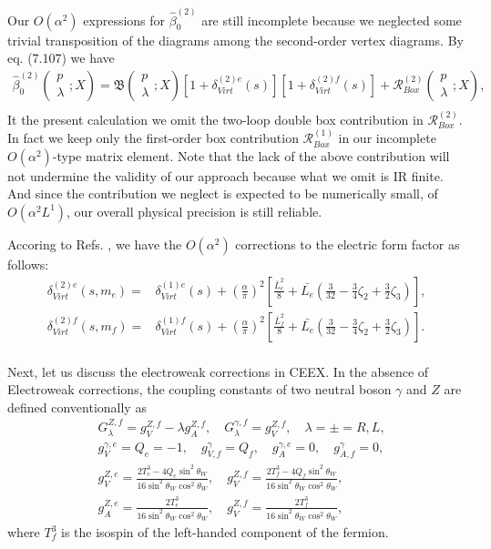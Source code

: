 Our $O(\alpha^2)$ expressions for $\hat{\beta}^{(2)}_0$ are still incomplete because we neglected some trivial transposition of the diagrams among the second-order vertex diagrams.  By eq. (7.107) we have 
\begin{eqnarray}
\hat{\beta}_0^{(2)}\left(\begin{array}{c}
p\\\lambda
\end{array};X\right)=\mathfrak{B}\left(\begin{array}{c}
p\\\lambda
\end{array};X\right)[1+\delta^{(2)e}_{Virt}(s)][1+\delta^{(2)f}_{Virt}(s)]+\mathcal{R}_{Box}^{(2)}\left(\begin{array}{c}
p\\\lambda
\end{array};X\right),\nonumber\\
\end{eqnarray}
It the present calculation we omit the two-loop double box contribution in $\mathcal{R}_{Box}^{(2)}$. In fact we keep only the first-order box contribution $\mathcal{R}_{Box}^{(1)}$ in our incomplete $O(\alpha^2)$-type matrix element. Note that the lack of the above contribution will not undermine the validity of our approach because what we omit is IR finite. And since the contribution we neglect is expected to be numerically small, of $O(\alpha^2 L^1)$, our overall physical precision is still reliable.

Accoring to Refs. \cite{BWF-NPB,Burges,BBW}, we have the $O(\alpha^2)$ corrections to the electric form factor as follows:
\begin{align}
\delta^{(2)e}_{Virt}(s,m_e)=&\delta^{(1)e}_{Virt}(s)+\left(\frac{\alpha}{\pi}\right)^2\left[ \frac{\bar{L}^2_e}{8}+\bar{L_e}\left(\frac{3}{32}-\frac{3}{4}\zeta_2+\frac{3}{2}\zeta_3\right) \right],\nonumber\\
\delta^{(2)f}_{Virt}(s,m_f)=&\delta^{(1)f}_{Virt}(s)+\left(\frac{\alpha}{\pi}\right)^2\left[ \frac{\bar{L}^2_f}{8}+\bar{L_e}\left(\frac{3}{32}-\frac{3}{4}\zeta_2+\frac{3}{2}\zeta_3\right) \right].\nonumber\\
\end{align}

Next, let us discuss the electroweak corrections in CEEX. In the absence of Electroweak corrections, the coupling constants of two neutral boson $\gamma$ and $Z$ are defined conventionally as
\begin{align}
&G^{Z,f}_\lambda=g^{Z,f}_V-\lambda g^{Z,f}_A,\quad G_\lambda^{\gamma,f}=g^{Z,f}_V, \quad \lambda=\pm=R,L,\nonumber\\
&g^{\gamma,e}_V=Q_e=-1,\quad g^\gamma_{V,f}=Q_f,\quad g^{\gamma,e}_A=0,\quad g^\gamma_{A,f}=0,\nonumber\\
&g^{Z,e}_V=\frac{2T^3_e-4Q_e\sin^2\theta_W}{16\sin^2\theta_W\cos^2\theta_W},\quad g^{Z,f}_V=\frac{2T^3_f-4Q_f\sin^2\theta_W}{16\sin^2\theta_W\cos^2\theta_W},\nonumber\\
&g^{Z,e}_A=\frac{2T^3_e}{16\sin^2\theta_W\cos^2\theta_W},\quad g^{Z,f}_V=\frac{2T^3_f}{16\sin^2\theta_W\cos^2\theta_W},
\end{align}
where $T^3_f$ is the isospin of the left-handed component of the fermion.

